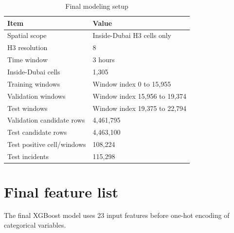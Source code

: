 \begin{table}[H]
\centering
\caption{Final modeling setup}
\label{tab:appendix_final_setup}
\small
\begin{tabularx}{\textwidth}{L{0.34\textwidth}Y}
\toprule
\textbf{Item} & \textbf{Value} \\
\midrule
Spatial scope & Inside-Dubai H3 cells only \\
H3 resolution & 8 \\
Time window & 3 hours \\
Inside-Dubai cells & 1,305 \\
Training windows & Window index 0 to 15,955 \\
Validation windows & Window index 15,956 to 19,374 \\
Test windows & Window index 19,375 to 22,794 \\
Validation candidate rows & 4,461,795 \\
Test candidate rows & 4,463,100 \\
Test positive cell/windows & 108,224 \\
Test incidents & 115,298 \\
\bottomrule
\end{tabularx}
\end{table}

\section{Final feature list}

The final XGBoost model uses 23 input features before one-hot encoding of categorical variables.

